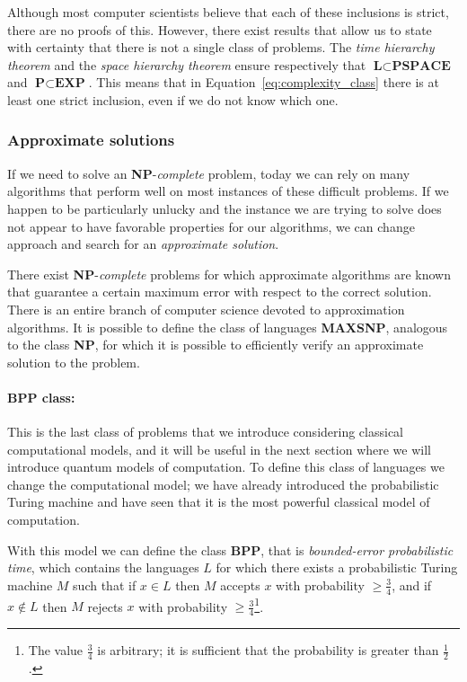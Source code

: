 Although most computer scientists believe that each of these inclusions is strict, there are no proofs of this. However, there exist results that allow us to state with certainty that there is not a single class of problems. The \emph{time hierarchy theorem} and the \emph{space hierarchy theorem} ensure respectively that $\textbf{L} \subset \textbf{PSPACE}$ and $\textbf{P} \subset \textbf{EXP}$. This means that in Equation~\ref{eq:complexity_class} there is at least one strict inclusion, even if we do not know which one.

\subsubsection*{Approximate solutions}
If we need to solve an \textbf{NP}-\emph{complete} problem, today we can rely on many algorithms that perform well on most instances of these difficult problems. If we happen to be particularly unlucky and the instance we are trying to solve does not appear to have favorable properties for our algorithms, we can change approach and search for an \emph{approximate solution}.

There exist \textbf{NP}-\emph{complete} problems for which approximate algorithms are known that guarantee a certain maximum error with respect to the correct solution. There is an entire branch of computer science devoted to approximation algorithms. It is possible to define the class of languages \textbf{MAXSNP}, analogous to the class \textbf{NP}, for which it is possible to efficiently verify an approximate solution to the problem.

\paragraph{BPP class:} This is the last class of problems that we introduce considering classical computational models, and it will be useful in the next section where we will introduce quantum models of computation. To define this class of languages we change the computational model; we have already introduced the probabilistic Turing machine and have seen that it is the most powerful classical model of computation.

With this model we can define the class \textbf{BPP}, that is \emph{bounded-error probabilistic time}, which contains the languages $L$ for which there exists a probabilistic Turing machine $M$ such that if $x\in L$ then $M$ accepts $x$ with probability $\geq \frac{3}{4}$, and if $x\notin L$ then $M$ rejects $x$ with probability $\geq \frac{3}{4}$\footnote{The value $\frac{3}{4}$ is arbitrary; it is sufficient that the probability is greater than $\frac{1}{2}$.}.

